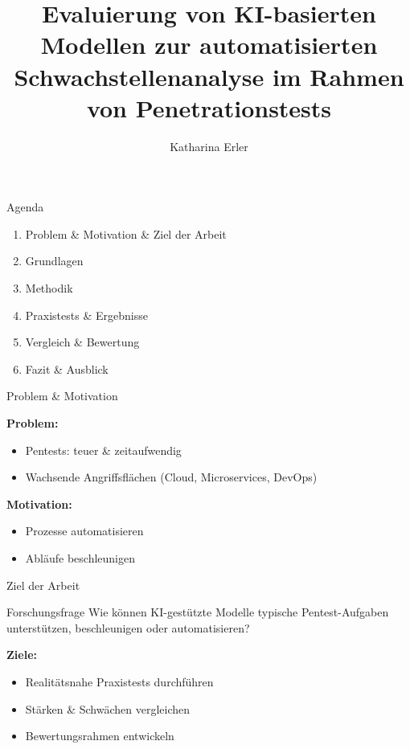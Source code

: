 \documentclass[
	aspectratio=169,	%
	onlytextwidth,		%
	t,					%
	]{beamer}
\title{Evaluierung von KI-basierten Modellen zur automatisierten Schwachstellenanalyse im Rahmen von Penetrationstests}
\author[Katharina Erler]{Katharina Erler}
\begin{document}
	
\begin{frame}{Agenda}
	\begin{enumerate}
		\item Problem \& Motivation \& Ziel der Arbeit
		\item Grundlagen
		\item Methodik
		\item Praxistests \& Ergebnisse
		\item Vergleich \& Bewertung
		\item Fazit \& Ausblick
	\end{enumerate}
\end{frame}



\begin{frame}{Problem \& Motivation}
	
	\textbf{Problem:}
	\begin{itemize}
		\item Pentests: teuer \& zeitaufwendig
		\item Wachsende Angriffsflächen (Cloud, Microservices, DevOps)
	\end{itemize}
	
	\vspace{0.5cm} 
	\textbf{Motivation:}
	\begin{itemize}
		\item Prozesse automatisieren
		\item Abläufe beschleunigen
		
	\end{itemize}
\end{frame}


\begin{frame}{Ziel der Arbeit}	
	\begin{block}{Forschungsfrage}
		Wie können KI-gestützte Modelle typische Pentest-Aufgaben 
		unterstützen, beschleunigen oder automatisieren?
	\end{block}
	
	\vspace{0.5cm}
	\textbf{Ziele:}
	\begin{itemize}
		\item Realitätsnahe Praxistests durchführen
		\item Stärken \& Schwächen vergleichen
		\item Bewertungsrahmen entwickeln
	\end{itemize}
\end{frame}
\end{document}
